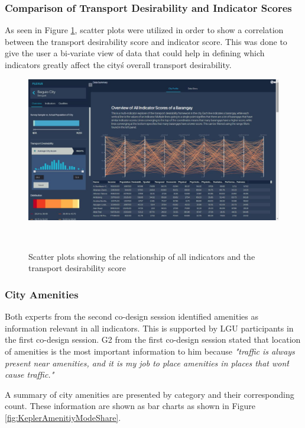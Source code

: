 \documentclass{sigchi}
\begin{document}
\subsubsection{Comparison of Transport Desirability and Indicator Scores}
As seen in Figure \ref{fig:KeplerScatterPlot}, scatter plots were utilized in order to show a correlation between the transport desirability score and indicator score. This was done to give the user a bi-variate view of data that could help in defining which indicators greatly affect the city\'s overall transport desirability.

\begin{figure}
\centering
  \includegraphics[width=0.9\columnwidth]{figures/latest-screens/pcords.jpg}
  \caption{Scatter plots showing the relationship of all indicators and the transport desirability score}~\label{fig:KeplerScatterPlot}
\end{figure}

\subsubsection{City Amenities}
Both experts from the second co-design session identified amenities as information relevant in all indicators. This is supported by LGU participants in the first co-design session. G2 from the first co-design session stated that location of amenities is the most important information to him because \textit{"traffic is always present near amenities, and it is my job to place amenities in places that won\'t cause traffic."} 


A summary of city amenities are presented by category and their corresponding count. These information are shown as bar charts as shown in Figure \ref{fig:KeplerAmenitiyModeShare}.
\end{document}
